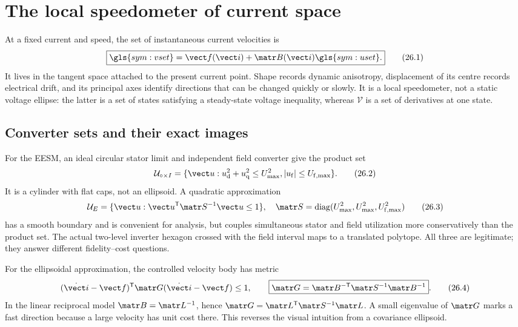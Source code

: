 \section{The local speedometer of current space}
\label{sec:velocity-geometry}

At a fixed current and speed, the set of instantaneous current velocities is
\[
 \boxed{\gls{sym:vset}=\vect f(\vect i)+\matr B(\vect i)\gls{sym:uset}.}
 \tag{26.1}
\]
It lives in the tangent space attached to the present current point.  Shape
records dynamic anisotropy, displacement of its centre records electrical
drift, and its principal axes identify directions that can be changed quickly
or slowly.  It is a local speedometer, not a static voltage ellipse: the
latter is a set of states satisfying a steady-state voltage inequality,
whereas \(\mathcal V\) is a set of derivatives at one state.

\subsection{Converter sets and their exact images}

For the EESM, an ideal circular stator limit and independent field converter
give the product set
\[
 \mathcal U_{\circ\times I}=
 \{\vect u:u_{\mathrm d}^2+u_{\mathrm q}^2\leq U_{\max}^2,
 |u_{\mathrm f}|\leq U_{\mathrm f,\max}\}.
 \tag{26.2}
\]
It is a cylinder with flat caps, not an ellipsoid.  A quadratic approximation
\[
 \mathcal U_E=\{\vect u:\vect u^{\mathsf T}\matr S^{-1}\vect u\leq1\},
 \quad \matr S=\operatorname{diag}(U_{\max}^2,U_{\max}^2,U_{\mathrm f,\max}^2)
 \tag{26.3}
\]
has a smooth boundary and is convenient for analysis, but couples simultaneous
stator and field utilization more conservatively than the product set.  The
actual two-level inverter hexagon crossed with the field interval maps to a
translated polytope.  All three are legitimate; they answer different
fidelity--cost questions.

For the ellipsoidal approximation, the controlled velocity body has metric
\[
 (\dot{\vect i}-\vect f)^{\mathsf T}\matr G
 (\dot{\vect i}-\vect f)\leq1,
 \qquad
 \boxed{\matr G=\matr B^{-\mathsf T}\matr S^{-1}\matr B^{-1}}.
 \tag{26.4}
\]
In the linear reciprocal model \(\matr B=\matr L^{-1}\), hence
\(\matr G=\matr L^{\mathsf T}\matr S^{-1}\matr L\).  A small eigenvalue of
\(\matr G\) marks a fast direction because a large velocity has unit cost
there.  This reverses the visual intuition from a covariance ellipsoid.

